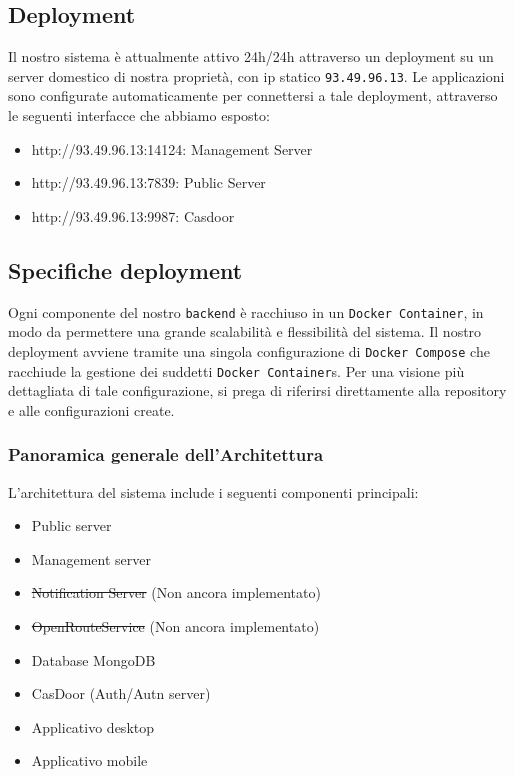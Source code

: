 \documentclass{article}
\begin{document}
\subsection{Deployment}
Il nostro sistema è attualmente attivo 24h/24h attraverso un deployment su un server domestico di nostra proprietà, con ip statico \texttt{93.49.96.13}.
Le applicazioni sono configurate automaticamente per connettersi a tale deployment, attraverso le seguenti interfacce che abbiamo esposto:
\begin{itemize}
	\item http://93.49.96.13:14124: Management Server
	\item http://93.49.96.13:7839: Public Server
	\item http://93.49.96.13:9987: Casdoor
\end{itemize}

\subsection{Specifiche deployment}
Ogni componente del nostro \texttt{backend} è racchiuso in un \texttt{Docker Container}, in modo da permettere una grande scalabilità e flessibilità del sistema.
Il nostro deployment avviene tramite una singola configurazione di \texttt{Docker Compose} che racchiude la gestione dei suddetti \texttt{Docker Container}s.
Per una visione più dettagliata di tale configurazione, si prega di riferirsi direttamente alla repository e alle configurazioni create.

\subsubsection{Panoramica generale dell'Architettura}
L'architettura del sistema include i seguenti componenti principali:
\begin{itemize}
    \item Public server
    \item Management server
    \item \st{Notification Server} (Non ancora implementato)
    \item \st{OpenRouteService} (Non ancora implementato)
    \item Database MongoDB
    \item CasDoor (Auth/Autn server)
    \item Applicativo desktop
    \item Applicativo mobile
\end{itemize}
\end{document}
